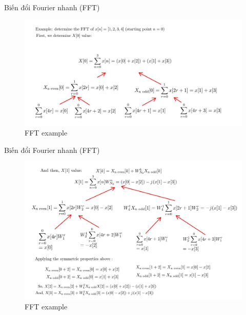 \documentclass[8pt]{beamer}
\begin{document}
\begin{frame}{Biến đổi Fourier nhanh (FFT)}
\begin{figure}[h]
			\includegraphics[width=1.1\textwidth]{5.jpg}

			\caption{FFT example}			\label{fig:re5}

		\end{figure}

\end{frame}
\begin{frame}{Biến đổi Fourier nhanh (FFT)}
\begin{figure}[h]
			\includegraphics[width=1.1\textwidth]{6.jpg}

			\caption{FFT example}			\label{fig:re6}

		\end{figure}

\end{frame}
\end{document}
